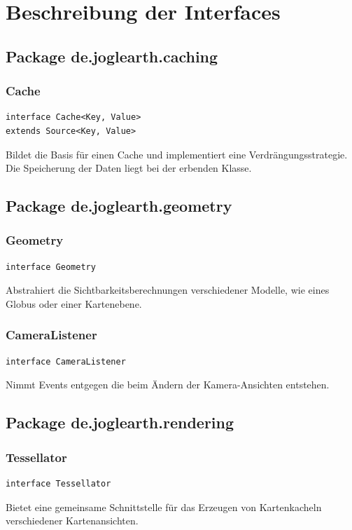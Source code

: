 \documentclass[10pt]{scrreprt}
\begin{document}
\chapter{Beschreibung der Interfaces}

\section{Package de.joglearth.caching}
\subsection*{Cache}
\begin{lstlisting}
interface Cache<Key, Value>
extends Source<Key, Value>
\end{lstlisting}
Bildet die Basis für einen Cache und implementiert eine Verdrängungsstrategie. Die Speicherung der Daten liegt bei der erbenden Klasse.\\


\vspace{5mm}
\section{Package de.joglearth.geometry}
\subsection*{Geometry}
\begin{lstlisting}
interface Geometry
\end{lstlisting}
Abstrahiert die Sichtbarkeitsberechnungen verschiedener Modelle, wie eines Globus oder einer Kartenebene.\\

\vspace{5mm}
\subsection*{CameraListener}
\begin{lstlisting}
interface CameraListener
\end{lstlisting}
Nimmt Events entgegen die beim Ändern der Kamera-Ansichten entstehen.\\


\vspace{5mm}
\section{Package de.joglearth.rendering}
\subsection*{Tessellator}
\begin{lstlisting}
interface Tessellator
\end{lstlisting}
Bietet eine gemeinsame Schnittstelle für das Erzeugen von Kartenkacheln verschiedener Kartenansichten.\\
\end{document}
